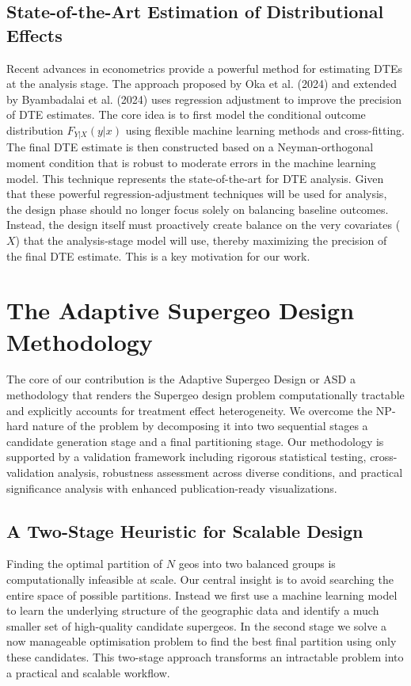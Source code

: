 \documentclass[final,3p,fleqn, 10pt]{elsarticle}
\begin{document}
    \subsection{State-of-the-Art Estimation of Distributional Effects}
    Recent advances in econometrics provide a powerful method for estimating DTEs at the analysis stage. The approach proposed by Oka et al. (2024) and extended by Byambadalai et al. (2024) uses regression adjustment to improve the precision of DTE estimates. The core idea is to first model the conditional outcome distribution $F_{Y|X}(y|x)$ using flexible machine learning methods and cross-fitting. The final DTE estimate is then constructed based on a Neyman-orthogonal moment condition that is robust to moderate errors in the machine learning model. This technique represents the state-of-the-art for DTE analysis. Given that these powerful regression-adjustment techniques will be used for analysis, the design phase should no longer focus solely on balancing baseline outcomes. Instead, the design itself must proactively create balance on the very covariates ($X$) that the analysis-stage model will use, thereby maximizing the precision of the final DTE estimate. This is a key motivation for our work.

\section{The Adaptive Supergeo Design Methodology}
\label{sec:methodology}
The core of our contribution is the Adaptive Supergeo Design or ASD a methodology that renders the Supergeo design problem computationally tractable and explicitly accounts for treatment effect heterogeneity. We overcome the NP-hard nature of the problem by decomposing it into two sequential stages a candidate generation stage and a final partitioning stage. Our methodology is supported by a validation framework including rigorous statistical testing, cross-validation analysis, robustness assessment across diverse conditions, and practical significance analysis with enhanced publication-ready visualizations.

    \subsection{A Two-Stage Heuristic for Scalable Design}
    Finding the optimal partition of $N$ geos into two balanced groups is computationally infeasible at scale. Our central insight is to avoid searching the entire space of possible partitions. Instead we first use a machine learning model to learn the underlying structure of the geographic data and identify a much smaller set of high-quality candidate supergeos. In the second stage we solve a now manageable optimisation problem to find the best final partition using only these candidates. This two-stage approach transforms an intractable problem into a practical and scalable workflow.
\end{document}
